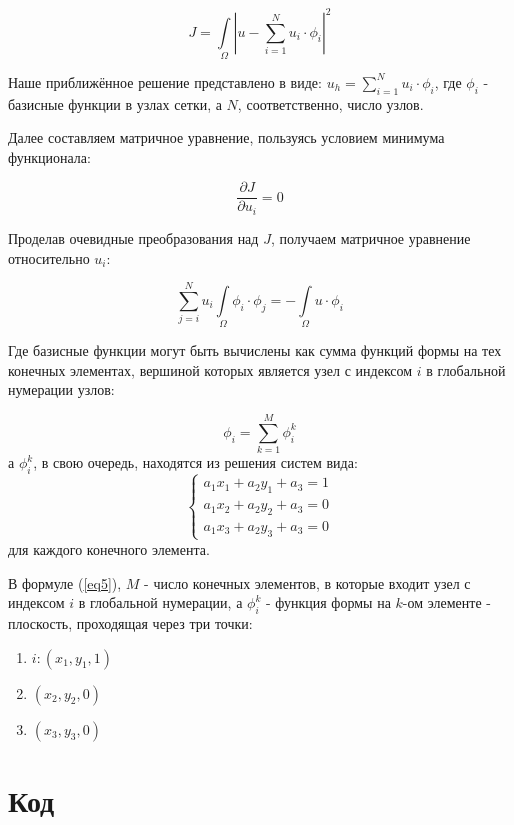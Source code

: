 \documentclass[12pt]{article}
\begin{document}
\begin{equation}
 J = \int\limits_{\Omega}|u - \sum_{i=1}^N u_i \cdot \phi_i|^2
\end{equation}

Наше приближённое решение представлено в виде: $u_h = \sum\limits_{i=1}^N u_i \cdot \phi_i$, где $\phi_i$ - базисные функции в узлах сетки, а $N$, соответственно, число узлов.

Далее составляем матричное уравнение, пользуясь условием минимума функционала:

\begin{equation}
 \dfrac{\partial J}{\partial u_i} = 0
\end{equation}

Проделав очевидные преобразования над $J$, получаем матричное уравнение относительно $u_i$:

\begin{equation}
 \sum_{j=i}^{N}u_i\int\limits_{\Omega}\phi_i \cdot \phi_j = -\int\limits_{\Omega} u \cdot \phi_i
\end{equation}

Где базисные функции могут быть вычислены как сумма функций формы на тех конечных элементах, вершиной которых является узел с индексом $i$ в глобальной нумерации узлов:

\begin{equation} \label{eq5}
 \phi_i = \sum_{k = 1}^{M}\phi_i^k
\end{equation}
а $\phi_i^k$, в свою очередь, находятся из решения систем вида:
\begin{equation}
 \begin{cases}
  a_1x_1 + a_2y_1 + a_3 = 1 \\
  a_1x_2 + a_2y_2 + a_3 = 0 \\
  a_1x_3 + a_2y_3 + a_3 = 0
 \end{cases}
\end{equation}
для каждого конечного элемента.

В формуле (\ref{eq5}), $M$ - число конечных элементов, в которые входит узел с индексом $i$ в глобальной нумерации, а $\phi_i^k$ - функция формы на $k$-ом элементе - плоскость, проходящая через три точки:
\begin{enumerate}
 \item $i: (x_1, y_1, 1)$
 \item $(x_2, y_2, 0)$
 \item $(x_3, y_3, 0)$
\end{enumerate}


\section{Код}
\end{document}

